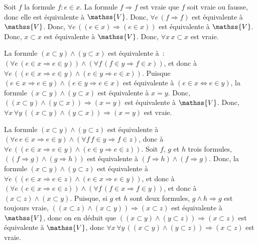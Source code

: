 \noindent {} 
\startitemize[nowhite]
  \item Soit $f$ la formule $f: e \in x$. 
      La formule $f \Rightarrow f$ est vraie que $f$ soit vraie ou fausse, donc elle est équivalente à $\mathss{V}$. 
      Donc, $\forall e \, (f \Rightarrow f)$ est équivalente à $\mathss{V}$.
      Donc, $\forall e \, ((e \in x) \Rightarrow (e \in x))$ est équivalente à $\mathss{V}$. 
      Donc, $x \subset x$ est équivalente à $\mathss{V}$. 
      Donc, $\forall x \, x \subset x$ est vraie. 
  \item La formule $(x \subset y) \wedge (y \subset x)$ est équivalente à : $(\forall e \, (e \in x \Rightarrow e \in y)) \wedge (\forall f \, (f \in y \Rightarrow f \in x))$, et donc à $\forall e \, ((e \in x \Rightarrow e \in y) \wedge (e \in y \Rightarrow e \in x))$. 
      Puisque $(e \in x \Rightarrow e \in y) \wedge (e \in y \Rightarrow e \in x)$ est équivalente à $(e \in x \Leftrightarrow e \in y)$, la formule $(x \subset y) \wedge (y \subset x)$ est équivalente à $x = y$.
      Donc, $((x \subset y) \wedge (y \subset x)) \Rightarrow (x = y)$ est équivalente à $\mathss{V}$. 
      Donc, $\forall x \, \forall y \, ((x \subset y) \wedge (y \subset x)) \Rightarrow (x = y)$ est vraie. 
  \item La formule $(x \subset y) \wedge (y \subset z)$ est équivalente à $(\forall e \, e \in x \Rightarrow e \in y) \wedge (\forall f \, f \in y \Rightarrow f \in z)$, donc à $\forall e \, ((e \in x \Rightarrow e \in y) \wedge (e \in y \Rightarrow e \in z))$. 
      Soit $f$, $g$ et $h$ trois formules, $((f \Rightarrow g) \wedge (g \Rightarrow h))$ est équivalente à $(f \Rightarrow h) \wedge (f \Rightarrow g)$.
      Donc, la formule $(x \subset y) \wedge (y \subset z)$ est équivalente à $\forall e \, ((e \in x \Rightarrow e \in z) \wedge (e \in x \Rightarrow e \in y))$, et donc à $(\forall e \, (e \in x \Rightarrow e \in z)) \wedge (\forall f \, (f \in x \Rightarrow f \in y))$, et donc à $(x \subset z) \wedge (x \subset y)$. 
      Puisque, si $g$ et $h$ sont deux formules, $g \wedge h \Rightarrow g$ est toujours vraie, $((x \subset z) \wedge (x \subset y)) \Rightarrow (x \subset z)$ est équivalente à $\mathss{V}$, donc on en déduit que $((x \subset y) \wedge (y \subset z)) \Rightarrow (x \subset z)$ est équivalente à $\mathss{V}$, donc $\forall x \, \forall y \, ((x \subset y) \wedge (y \subset z)) \Rightarrow (x \subset z)$ est vraie.
\stopitemize

\done

\blank[medium]


